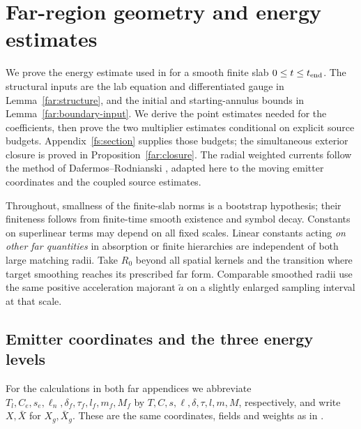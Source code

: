 \section{Far-region geometry and energy estimates}\label{fe:section}

We prove the energy estimate used in  for a smooth
finite slab $0\le t\le t_{\rm end}$.  The structural inputs are
the lab equation and differentiated gauge in Lemma~\ref{far:structure},
and the initial and starting-annulus bounds in
Lemma~\ref{far:boundary-input}.  We derive the point estimates needed
for the coefficients, then prove the two multiplier estimates conditional
on explicit source budgets.  Appendix~\ref{fs:section} supplies those
budgets; the simultaneous exterior closure is proved in
Proposition~\ref{far:closure}. The radial weighted
currents follow the method of Dafermos--Rodnianski
\cite[Sections~3--4]{DafermosRodnianski2010}, adapted here to the moving emitter
coordinates and the coupled source estimates.

Throughout, smallness of the finite-slab norms is a bootstrap hypothesis;
their finiteness follows from finite-time smooth existence and symbol
decay.  Constants on superlinear terms may depend on all fixed scales.
Linear constants acting \emph{on other far quantities} in absorption or
finite hierarchies are independent of both large matching radii.  Take
$R_0$ beyond all spatial kernels and the transition where target smoothing
reaches its prescribed far form.  Comparable smoothed radii use the same
positive acceleration majorant $\widetilde a$ on a slightly enlarged
sampling interval at that scale.

\subsection{Emitter coordinates and the three energy levels}\label{fe:coordinates}

For the calculations in both far appendices we abbreviate
$T_l,C_e,s_e,\ell_n,\delta_f,\tau_f,l_f,m_f,M_f$ by
$T,C,s,\ell,\delta,\tau,l,m,M$, respectively, and write
$X,\bar X$ for $X_g,\bar X_g$.  These are the same
coordinates, fields and weights as in .


